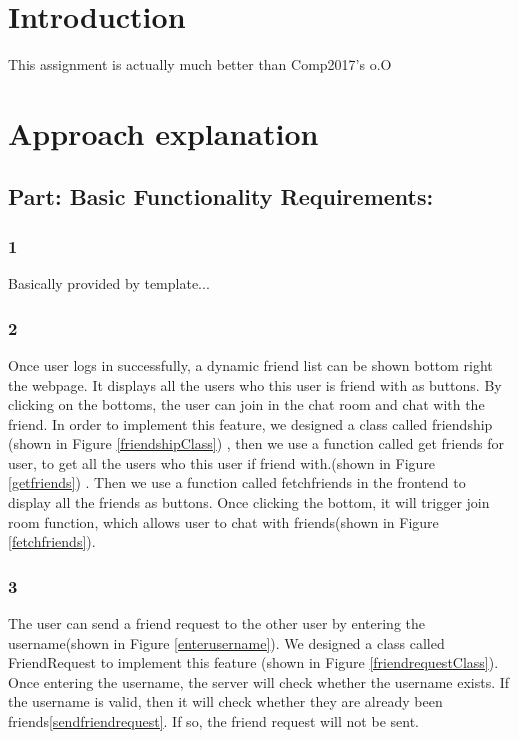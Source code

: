 \documentclass[12pt]{article}
\begin{document}
\section{Introduction}

This assignment is actually much better than Comp2017's o.O

\section{Approach explanation}
    \subsection*{Part: Basic Functionality Requirements:}
        \subsubsection*{1} Basically provided by template...

        \subsubsection*{2} Once user logs in successfully, a dynamic friend list can be shown bottom right the webpage. It displays all the users who this user is friend with as buttons. By clicking on the bottoms, the user can join in the chat room and chat with the friend. In order to implement this feature, we designed a class called friendship (shown in Figure \ref{friendshipClass}) , then we use a function called get friends for user, to get all the users who this user if friend with.(shown in Figure \ref{getfriends}) . Then we use a function called fetchfriends in the frontend to display all the friends as buttons. Once clicking the bottom, it will trigger join room function, which allows user to chat with friends(shown in Figure \ref{fetchfriends}).

        \subsubsection*{3} The user can send a friend request to the other user by entering the username(shown in Figure \ref{enterusername}). We designed a class called FriendRequest to implement this feature (shown in Figure \ref{friendrequestClass}). Once entering the username, the server will check whether the username exists. If the username is valid, then it will check whether they are already been friends\ref{sendfriendrequest}. If so, the friend request will not be sent.
	
\end{document}
